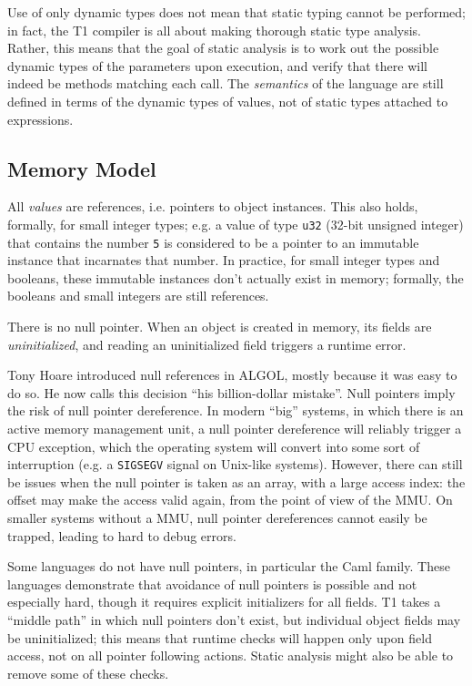 Use of only dynamic types does not mean that static typing cannot be
performed; in fact, the T1 compiler is all about making thorough static
type analysis. Rather, this means that the goal of static analysis is to
work out the possible dynamic types of the parameters upon execution,
and verify that there will indeed be methods matching each call. The
\emph{semantics} of the language are still defined in terms of the
dynamic types of values, not of static types attached to expressions.

\subsection{Memory Model}

All \emph{values} are references, i.e. pointers to object instances.
This also holds, formally, for small integer types; e.g. a value of type
\verb+u32+ (32-bit unsigned integer) that contains the number \verb+5+
is considered to be a pointer to an immutable instance that incarnates
that number. In practice, for small integer types and booleans, these
immutable instances don't actually exist in memory; formally, the
booleans and small integers are still references.

There is no null pointer. When an object is created in memory, its
fields are \emph{uninitialized}, and reading an uninitialized field
triggers a runtime error.

\begin{rationale}
Tony Hoare introduced null references in ALGOL, mostly because it was
easy to do so. He now calls this decision ``his billion-dollar
mistake''. Null pointers imply the risk of null pointer dereference. In
modern ``big'' systems, in which there is an active memory management
unit, a null pointer dereference will reliably trigger a CPU exception,
which the operating system will convert into some sort of interruption
(e.g. a \verb|SIGSEGV| signal on Unix-like systems). However, there can
still be issues when the null pointer is taken as an array, with a large
access index: the offset may make the access valid again, from the point
of view of the MMU. On smaller systems without a MMU, null pointer
dereferences cannot easily be trapped, leading to hard to debug errors.

Some languages do not have null pointers, in particular the Caml family.
These languages demonstrate that avoidance of null pointers is possible
and not especially hard, though it requires explicit initializers for
all fields. T1 takes a ``middle path'' in which null pointers don't
exist, but individual object fields may be uninitialized; this means
that runtime checks will happen only upon field access, not on all
pointer following actions. Static analysis might also be able to remove
some of these checks.
\end{rationale}

